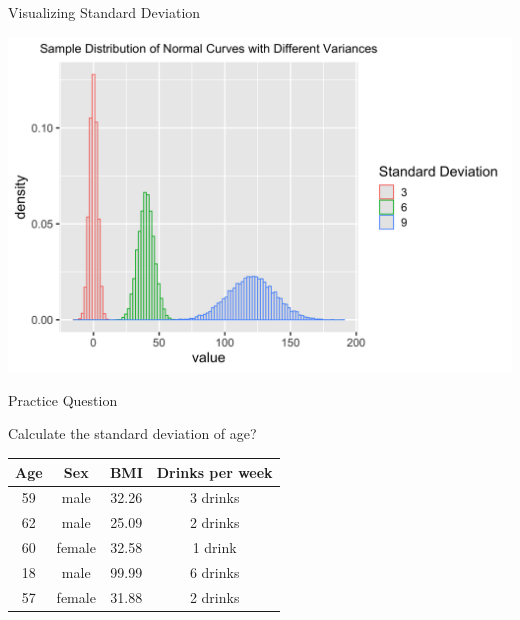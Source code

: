\documentclass{beamer}
\begin{document}
\begin{frame}{Visualizing Standard Deviation}
	\begin{center}
		\includegraphics[width=\linewidth]{normdist_multiplevars.png}
	\end{center}
\end{frame}


\begin{frame}{Practice Question}
	
	Calculate the standard deviation of age?
	\begin{center}
		\begin{tabular}{ | c | c | c | c |}
			\hline
			\textbf{Age} & \textbf{Sex} & \textbf{BMI} & \textbf{Drinks per week} \\ [0.5ex]
			\hline
			59           & male         & 32.26        & 3 drinks                 \\
			\hline
			62           & male         & 25.09        & 2 drinks                 \\
			\hline
			60           & female       & 32.58        & 1 drink                  \\ 
			\hline
			18           & male         & 99.99        & 6 drinks                 \\ 
			\hline
			57           & female       & 31.88        & 2 drinks                 \\ 
			\hline
		\end{tabular}
	\end{center}
\end{frame}
\end{document}
